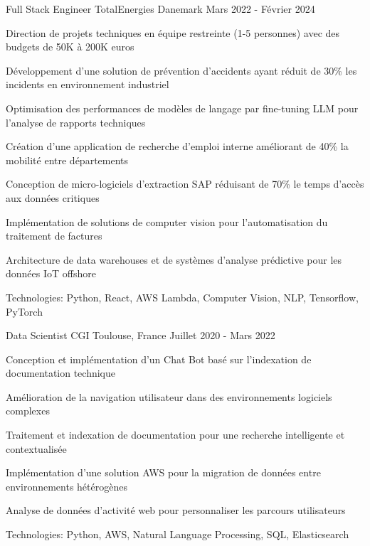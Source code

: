 \begin{cventries}

\cventry
{Full Stack Engineer} %
{TotalEnergies} %
{Danemark} %
{Mars 2022 - Février 2024} %
{ %
\begin{cvitems}
\item {Direction de projets techniques en équipe restreinte (1-5 personnes) avec des budgets de 50K à 200K euros}
\item {Développement d'une solution de prévention d'accidents ayant réduit de 30\% les incidents en environnement industriel}
\item {Optimisation des performances de modèles de langage par fine-tuning LLM pour l'analyse de rapports techniques}
\item {Création d'une application de recherche d'emploi interne améliorant de 40\% la mobilité entre départements}
\item {Conception de micro-logiciels d'extraction SAP réduisant de 70\% le temps d'accès aux données critiques}
\item {Implémentation de solutions de computer vision pour l'automatisation du traitement de factures}
\item {Architecture de data warehouses et de systèmes d'analyse prédictive pour les données IoT offshore}
\item {Technologies: Python, React, AWS Lambda, Computer Vision, NLP, Tensorflow, PyTorch}
\end{cvitems}
}
\vspace{1.5em}


\cventry
{Data Scientist} %
{CGI} %
{Toulouse, France} %
{Juillet 2020 - Mars 2022} %
{ %
\begin{cvitems}
\item {Conception et implémentation d'un Chat Bot basé sur l'indexation de documentation technique}
\item {Amélioration de la navigation utilisateur dans des environnements logiciels complexes}
\item {Traitement et indexation de documentation pour une recherche intelligente et contextualisée}
\item {Implémentation d'une solution AWS pour la migration de données entre environnements hétérogènes}
\item {Analyse de données d'activité web pour personnaliser les parcours utilisateurs}
\item {Technologies: Python, AWS, Natural Language Processing, SQL, Elasticsearch}
\end{cvitems}
}
\vspace{1.5em}


\end{cventries}